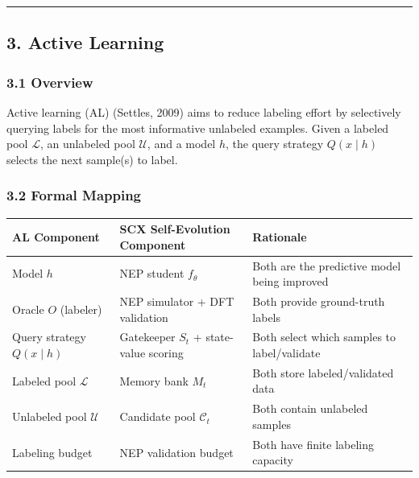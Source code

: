 \documentclass[
  12pt,
]{article}
\begin{document}
\begin{center}\rule{0.5\linewidth}{0.5pt}\end{center}

\subsection{3. Active Learning}\label{active-learning}

\subsubsection{3.1 Overview}\label{overview-2}

Active learning (AL) (Settles, 2009) aims to reduce labeling effort by
selectively querying labels for the most informative unlabeled examples.
Given a labeled pool \(\mathcal{L}\), an unlabeled pool \(\mathcal{U}\),
and a model \(h\), the query strategy \(Q(x \mid h)\) selects the next
sample(s) to label.

\subsubsection{3.2 Formal Mapping}\label{formal-mapping-2}

\begin{longtable}[]{@{}
  >{\raggedright\arraybackslash}p{}
  >{\raggedright\arraybackslash}p{}
  >{\raggedright\arraybackslash}p{}@{}}
\toprule\noalign{}
\begin{minipage}[b]{\linewidth}\raggedright
AL Component
\end{minipage} & \begin{minipage}[b]{\linewidth}\raggedright
SCX Self-Evolution Component
\end{minipage} & \begin{minipage}[b]{\linewidth}\raggedright
Rationale
\end{minipage} \\
\midrule\noalign{}
\endhead
\bottomrule\noalign{}
\endlastfoot
Model \(h\) & NEP student \(f_\theta\) & Both are the predictive model
being improved \\
Oracle \(O\) (labeler) & NEP simulator + DFT validation & Both provide
ground-truth labels \\
Query strategy \(Q(x \mid h)\) & Gatekeeper \(S_t\) + state-value
scoring & Both select which samples to label/validate \\
Labeled pool \(\mathcal{L}\) & Memory bank \(M_t\) & Both store
labeled/validated data \\
Unlabeled pool \(\mathcal{U}\) & Candidate pool \(\mathcal{C}_t\) & Both
contain unlabeled samples \\
Labeling budget & NEP validation budget & Both have finite labeling
capacity \\
\end{longtable}
\end{document}
